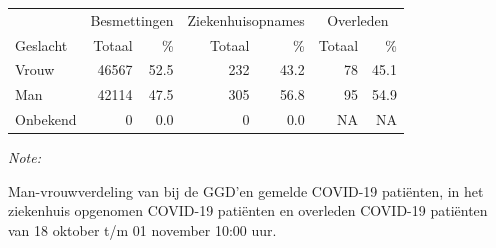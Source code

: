\documentclass[
  english,
  man,floatsintext]{apa6}
\begin{document}
\begin{table}
\centering\begingroup\fontsize{11}{13}\selectfont

\begin{threeparttable}
\begin{tabular}{lrrrrrr}
\toprule
\multicolumn{1}{c}{ } & \multicolumn{2}{c}{Besmettingen} & \multicolumn{2}{c}{Ziekenhuisopnames} & \multicolumn{2}{c}{Overleden} \\
\cmidrule(l{3pt}r{3pt}){2-3} \cmidrule(l{3pt}r{3pt}){4-5} \cmidrule(l{3pt}r{3pt}){6-7}
Geslacht & Totaal & \% & Totaal & \% & Totaal & \%\\
\midrule
Vrouw & 46567 & 52.5 & 232 & 43.2 & 78 & 45.1\\
Man & 42114 & 47.5 & 305 & 56.8 & 95 & 54.9\\
Onbekend & 0 & 0.0 & 0 & 0.0 & NA & NA\\
\bottomrule
\end{tabular}
\begin{tablenotes}
\item \textit{Note: } 
\item Man-vrouwverdeling van bij de GGD’en gemelde COVID-19 patiënten, in het ziekenhuis opgenomen COVID-19 patiënten en overleden COVID-19 patiënten van 18 oktober t/m 01 november 10:00 uur.
\end{tablenotes}
\end{threeparttable}
\endgroup{}
\end{table}
\newpage
\end{document}
